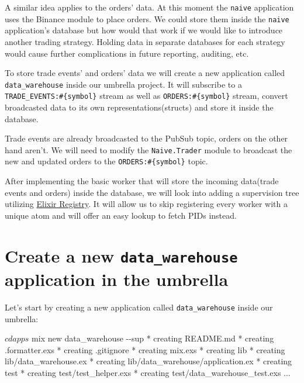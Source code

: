 \documentclass[
  oneside]{book}
\newenvironment{Shaded}{\begin{snugshade}}{\end{snugshade}}
\newcommand{\AttributeTok}[1]{\textcolor[rgb]{0.13,0.29,0.53}{#1}}
\newcommand{\ExtensionTok}[1]{#1}
\newcommand{\NormalTok}[1]{#1}
\begin{document}
A similar idea applies to the orders' data. At this moment the \texttt{naive} application uses the Binance module to place orders. We could store them inside the \texttt{naive} application's database but how would that work if we would like to introduce another trading strategy. Holding data in separate databases for each strategy would cause further complications in future reporting, auditing, etc.

To store trade events' and orders' data we will create a new application called \texttt{data\_warehouse} inside our umbrella project. It will subscribe to a \texttt{TRADE\_EVENTS:\#\{symbol\}} stream as well as \texttt{ORDERS:\#\{symbol\}} stream, convert broadcasted data to its own representations(structs) and store it inside the database.

Trade events are already broadcasted to the PubSub topic, orders on the other hand aren't. We will need to modify the \texttt{Naive.Trader} module to broadcast the new and updated orders to the \texttt{ORDERS:\#\{symbol\}} topic.

After implementing the basic worker that will store the incoming data(trade events and orders) inside the database, we will look into adding a supervision tree utilizing \href{https://hexdocs.pm/elixir/master/Registry.html}{Elixir Registry}. It will allow us to skip registering every worker with a unique atom and will offer an easy lookup to fetch PIDs instead.

\section{\texorpdfstring{Create a new \texttt{data\_warehouse} application in the umbrella}{Create a new data\_warehouse application in the umbrella}}\label{create-a-new-data_warehouse-application-in-the-umbrella}

Let's start by creating a new application called \texttt{data\_warehouse} inside our umbrella:

\begin{Shaded}
\begin{Highlighting}[]
\ExtensionTok{$}\NormalTok{ cd apps}
\ExtensionTok{$}\NormalTok{ mix new data\_warehouse }\AttributeTok{{-}{-}sup}
\ExtensionTok{*}\NormalTok{ creating README.md}
\ExtensionTok{*}\NormalTok{ creating .formatter.exs}
\ExtensionTok{*}\NormalTok{ creating .gitignore}
\ExtensionTok{*}\NormalTok{ creating mix.exs}
\ExtensionTok{*}\NormalTok{ creating lib}
\ExtensionTok{*}\NormalTok{ creating lib/data\_warehouse.ex}
\ExtensionTok{*}\NormalTok{ creating lib/data\_warehouse/application.ex}
\ExtensionTok{*}\NormalTok{ creating test}
\ExtensionTok{*}\NormalTok{ creating test/test\_helper.exs}
\ExtensionTok{*}\NormalTok{ creating test/data\_warehouse\_test.exs}
\ExtensionTok{...}
\end{Highlighting}
\end{Shaded}
\end{document}
